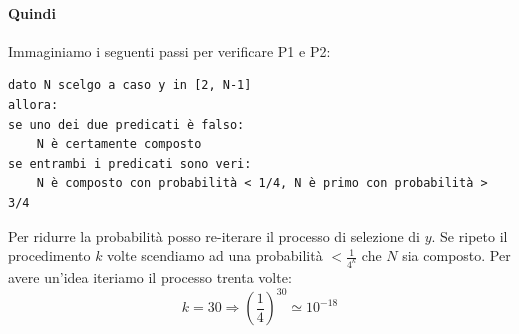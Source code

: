 \paragraph{Quindi} Immaginiamo i seguenti passi per verificare P1 e P2:
\begin{verbatim}
dato N scelgo a caso y in [2, N-1]
allora:
se uno dei due predicati è falso:
    N è certamente composto
se entrambi i predicati sono veri:
    N è composto con probabilità < 1/4, N è primo con probabilità > 3/4
\end{verbatim}
Per ridurre la probabilità posso re-iterare il processo di selezione di $y$. Se ripeto il procedimento $k$ volte scendiamo ad una probabilità 
$ < \frac{1}{4^k} $ che $N$ sia composto. Per avere un'idea  iteriamo il processo trenta volte:
\[k=30 \Longrightarrow \left(\frac{1}{4}\right)^{30} \simeq 10^{-18}\]


